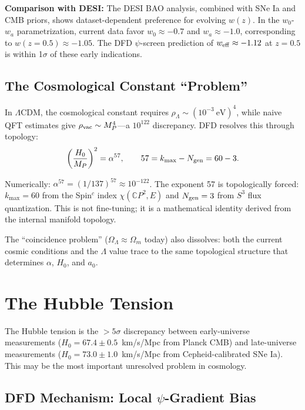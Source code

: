 \documentclass[aps,prd,twocolumn,superscriptaddress,nofootinbib]{revtex4-2}
\begin{document}
\textbf{Comparison with DESI:} The DESI BAO analysis, combined with
SNe Ia and CMB priors, shows dataset-dependent preference for evolving
$w(z)$. In the $w_0$-$w_a$ parametrization, current data favor
$w_0 \approx -0.7$ and $w_a \approx -1.0$, corresponding to
$w(z=0.5) \approx -1.05$. The DFD $\psi$-screen prediction of
$w_{\rm eff} \approx -1.12$ at $z = 0.5$ is within 1$\sigma$
of these early indications.

\subsection{The Cosmological Constant ``Problem''}

In $\Lambda$CDM, the cosmological constant requires
$\rho_\Lambda \sim (10^{-3}~\text{eV})^4$, while naive QFT
estimates give $\rho_{\rm vac} \sim M_P^4$---a $10^{122}$
discrepancy. DFD resolves this through topology:
\begin{equation}\label{eq:alpha57}
\left(\frac{H_0}{M_P}\right)^2 = \alpha^{57},
\qquad 57 = k_{\max} - N_{\rm gen} = 60 - 3.
\end{equation}

Numerically: $\alpha^{57} = (1/137)^{57} \approx 10^{-122}$.
The exponent 57 is topologically forced: $k_{\max} = 60$ from
the Spin$^c$ index $\chi(\mathbb{C}P^2, E)$ and $N_{\rm gen} = 3$
from $S^3$ flux quantization. This is not fine-tuning; it is a
mathematical identity derived from the internal manifold topology.

The ``coincidence problem'' ($\Omega_\Lambda \approx \Omega_m$
today) also dissolves: both the current cosmic conditions and the
$\Lambda$ value trace to the same topological structure that
determines $\alpha$, $H_0$, and $a_0$.

\section{The Hubble Tension}\label{sec:hubble-tension}

The Hubble tension is the $>5\sigma$ discrepancy between
early-universe measurements ($H_0 = 67.4 \pm 0.5$~km/s/Mpc from
Planck CMB) and late-universe measurements
($H_0 = 73.0 \pm 1.0$~km/s/Mpc from Cepheid-calibrated SNe Ia).
This may be the most important unresolved problem in cosmology.

\subsection{DFD Mechanism: Local $\psi$-Gradient Bias}
\end{document}
